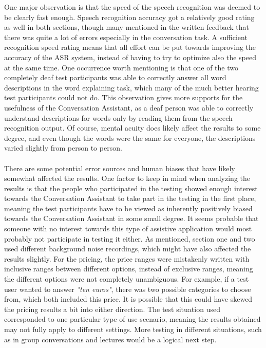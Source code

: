 \documentclass[english, 12pt, a4paper, pdftex, elec, utf8]{aaltothesis}
\begin{document}
One major observation is that the speed of the speech recognition was deemed to be clearly fast enough. Speech recognition accuracy got a relatively good rating as well in both sections, though many mentioned in the written feedback that there was quite a lot of errors especially in the conversation task. A sufficient recognition speed rating means that all effort can be put towards improving the accuracy of the ASR system, instead of having to try to optimize also the speed at the same time. One occurrence worth mentioning is that one of the two completely deaf test participants was able to correctly answer all word descriptions in the word explaining task, which many of the much better hearing test participants could not do. This observation gives more supports for the usefulness of the Conversation Assistant, as a deaf person was able to correctly understand descriptions for words only by reading them from the speech recognition output. Of course, mental acuity does likely affect the results to some degree, and even though the words were the same for everyone, the descriptions varied slightly from person to person. \\\\
There are some potential error sources and human biases that have likely somewhat affected the results. One factor to keep in mind when analyzing the results is that the people who participated in the testing showed enough interest towards the Conversation Assistant to take part in the testing in the first place, meaning the test participants have to be viewed as inherently positively biased towards the Conversation Assistant in some small degree. It seems probable that someone with no interest towards this type of assistive application would most probably not participate in testing it either. As mentioned, section one and two used different background noise recordings, which might have also affected the results slightly. For the pricing, the price ranges were mistakenly written with inclusive ranges between different options, instead of exclusive ranges, meaning the different options were not completely unambiguous. For example, if a test user wanted to answer \textit{"ten euros"}, there was two possible categories to choose from, which both included this price. It is possible that this could have skewed the pricing results a bit into either direction. The test situation used corresponded to one particular type of use scenario, meaning the results obtained may not fully apply to different settings. More testing in different situations, such as in group conversations and lectures would be a logical next step.
\end{document}
